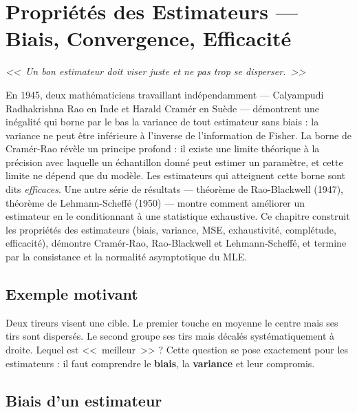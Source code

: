 \chapter{Propri\'et\'es des Estimateurs --- Biais, Convergence, Efficacit\'e}
\label{ch:proprietes}

\begin{center}
\textit{<<~Un bon estimateur doit viser juste et ne pas trop se disperser.~>>}
\end{center}

En 1945, deux mathématiciens travaillant indépendamment --- Calyampudi Radhakrishna Rao en Inde et Harald Cramér en Suède --- démontrent une inégalité qui borne par le bas la variance de tout estimateur sans biais : la variance ne peut être inférieure à l'inverse de l'information de Fisher. La borne de Cramér-Rao révèle un principe profond : il existe une limite théorique à la précision avec laquelle un échantillon donné peut estimer un paramètre, et cette limite ne dépend que du modèle. Les estimateurs qui atteignent cette borne sont dits \emph{efficaces}. Une autre série de résultats --- théorème de Rao-Blackwell (1947), théorème de Lehmann-Scheffé (1950) --- montre comment améliorer un estimateur en le conditionnant à une statistique exhaustive. Ce chapitre construit les propriétés des estimateurs (biais, variance, MSE, exhaustivité, complétude, efficacité), démontre Cramér-Rao, Rao-Blackwell et Lehmann-Scheffé, et termine par la consistance et la normalité asymptotique du MLE.

\section{Exemple motivant}

Deux tireurs visent une cible. Le premier touche en moyenne le centre mais ses tirs sont dispers\'es. Le second groupe ses tirs mais d\'ecal\'es syst\'ematiquement \`a droite. Lequel est <<~meilleur~>> ? Cette question se pose exactement pour les estimateurs : il faut comprendre le \textbf{biais}, la \textbf{variance} et leur compromis.

\section{Biais d'un estimateur}

